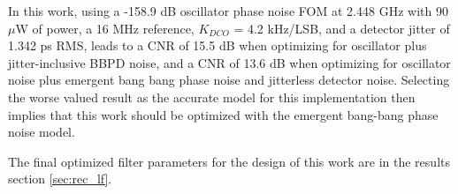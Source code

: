 	In this work, using a -158.9 dB oscillator phase noise FOM at 2.448 GHz with 90$\mu$W of power, a 16 MHz reference, $K_{DCO}$ = 4.2 kHz/LSB, and a detector jitter of 1.342 ps RMS, leads to a CNR of 15.5 dB when optimizing for oscillator plus jitter-inclusive BBPD noise, and a CNR of 13.6 dB when optimizing for oscillator noise plus emergent bang bang phase noise and jitterless detector noise. Selecting the worse valued result as the accurate model for this implementation then implies that this work should be optimized with the emergent bang-bang phase noise model.

	The final optimized filter parameters for the design of this work are in the results section \ref{sec:rec_lf}.






